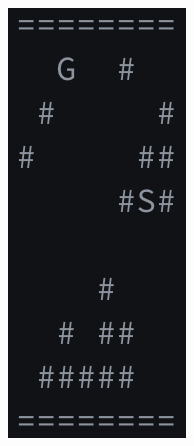 \documentclass{article}
\begin{document}
\begin{figure}
\begin{subfigure}{0.2\textwidth}
\includegraphics[width=0.8\linewidth]{sg-3.png}
\end{subfigure}
\begin{subfigure}{0.2\textwidth}
  \centering

\end{subfigure}
\end{figure}
\end{document}
